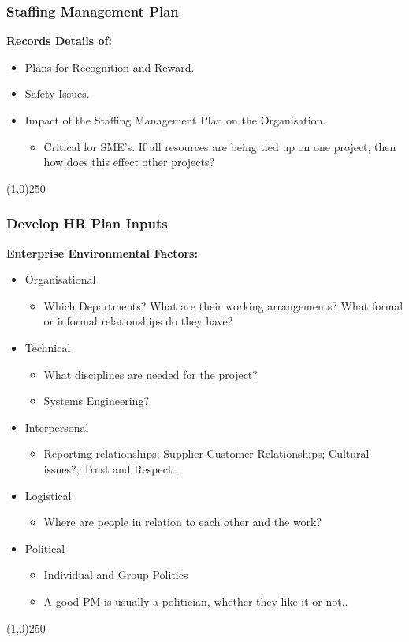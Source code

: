  
\begin{frame}
\frametitle{Staffing Management Plan}
\textbf{Records Details of:}
\begin{itemize}
	\item Plans for Recognition and Reward.\\
	\item Safety Issues.\\
	\item Impact of the Staffing Management Plan on the Organisation.\\
			\begin{itemize}
				\item Critical for SME's.  If all resources are being tied up on one project, then how does this effect other projects?
			\end{itemize}
\end{itemize}
\end{frame}\begin{center}\line(1,0){250}\end{center}


\begin{frame}
\frametitle{Develop HR Plan \hfill\hfill Inputs}
\textbf{Enterprise Environmental Factors:}
\begin{itemize}
	\item Organisational
		\begin{itemize}
			\item Which Departments? What are their working arrangements? What formal or informal relationships do they have? 
		\end{itemize}
	\item Technical
		\begin{itemize}
			\item What disciplines are needed for the project?
			\item Systems Engineering? 
		\end{itemize}
	\item Interpersonal
		\begin{itemize}
			\item Reporting relationships; Supplier-Customer Relationships; Cultural issues?; Trust and Respect..
		\end{itemize}
	\item Logistical
		\begin{itemize}
			\item Where are people in relation to each other and the work?
		\end{itemize}
	\item Political
		\begin{itemize}
			\item Individual and Group Politics
			\item A good PM is usually a politician, whether they like it or not.. \smiley
		\end{itemize}
\end{itemize}
\end{frame}\begin{center}\line(1,0){250}\end{center}
 
